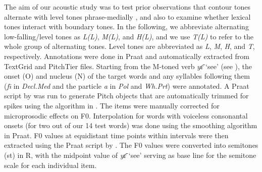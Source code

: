 \documentclass[output=paper,newtxmath,modfonts,nonflat,hidelinks]{langsci/langscibook}
\begin{document}
\noindent The aim of our acoustic study was to test prior observations that contour tones alternate with level tones phrase-medially \citep{Fransen.1995}, and also to examine whether lexical tones interact with boundary tones.
In the following, we abbreviate alternating low-falling\slash level tones as \textit{L(L)}, \textit{M(L)}, and \textit{H(L)}, and we use \textit{T(L)} to refer to the whole group of alternating tones. Level tones are abbreviated  as \textit{L}, \textit{M}, \textit{H}, and \textit{T}, respectively.
Annotations were done in Praat \citep{Praat2016} and automatically extracted from TextGrid and PitchTier files.
Starting from the M-toned verb \textit{y{\=ɛ}} `see' (see ), the onset (O) and nucleus (N) of the target words and any syllables following them (\textit{f\={\i}} in \textit{Decl.Med} and the particle \textit{a} in \textit{Pol} and \textit{Wh.Prt}) were annotated.
A Praat script by \citet{RemijsenTrimCheck} was run to generate Pitch objects that are automatically trimmed for spikes using the algorithm in \citet{Xu1999}.
The items were manually corrected for microprosodic effects on F0.   
Interpolation for words with voiceless consonantal onsets (for two out of our 14 test words) was done using the smoothing algorithm in Praat.
F0 values at equidistant time points within intervals were then extracted using the Praat script by  \citet{RemijsenScriptF0Norm}.
The F0 values were converted into semitones (st) in R, with the midpoint value of \textit{y{\=ɛ}} `see' serving as base line for the semitone scale for each individual item.
\end{document}
